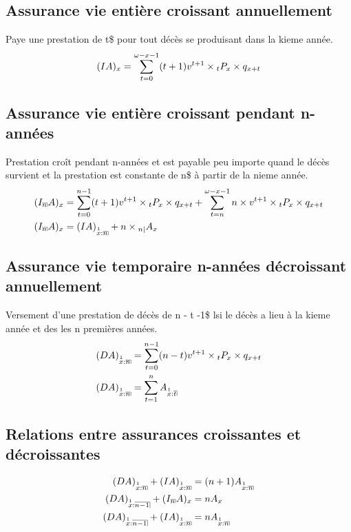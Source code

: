 \documentclass[11pt,french]{report}
\makeatletter
\DeclareRobustCommand{\annuity}[1]{%
\def\arraystretch{0}%
\setlength\arraycolsep{.7pt}%
\setlength\arrayrulewidth{.3pt}%
\begin{array}[b]{@{}c|}\hline
\\[\arraycolsep]%
\scriptstyle #1%
\end{array}%
}
\newcommand{\indiceGauche}[2]{{\vphantom{#2}}_{#1}#2}
\makeatother
\begin{document}
\subsection{Assurance vie entière croissant annuellement}
Paye une prestation de t\$ pour tout décès se produisant dans la kieme année.
\begin{align*}
(IA)_{x} &= \sum_{t=0}^{\omega - x-1}(t + 1)v^{t+1} \times \indiceGauche{t}{P}_{x} \times q_{x+t}\\
\end{align*}

\subsection{Assurance vie  entière croissant pendant n-années}
Prestation croît pendant n-années et est payable peu importe quand le décès survient et la prestation est constante de n\$ à partir de la nieme année.
\begin{align*}
(I_{\annuity{n}}A)_{x} &= \sum_{t=0}^{n-1}(t +1 )v^{t+1} \times \indiceGauche{t}{P}_{x} \times q_{x+t}  + \sum_{t =n}^{\omega - x - 1}n \times v^{t+1} \times \indiceGauche{t}{P}_{x} \times q_{x+t}  \\
(I_{\annuity{n}}A)_{x} &= (IA)_{\overset{1}{x}:\annuity{n}} + n \times \indiceGauche{n|}{A}_x\\
\end{align*}


\subsection{Assurance vie  temporaire n-années décroissant annuellement}
Versement d'une prestation de décès de n - t -1\$ lsi le décès a lieu à la kieme année et des les n premières années.
\begin{align*}
(DA)_{\overset{1}{x}:\annuity{n}} &= \sum_{t = 0}^{n-1}(n - t )v^{t+1} \times \indiceGauche{t}{P}_{x} \times q_{x+t} \\
(DA)_{\overset{1}{x}:\annuity{n}} &= \sum_{t = 1}^{n} A_{\overset{1}{x}:\annuity{t}}
\end{align*}

\subsection{Relations entre assurances croissantes et décroissantes}
\begin{align*}
(DA)_{\overset{1}{x}:\annuity{n}} + (IA)_{\overset{1}{x}:\annuity{n}} &= (n+1) A_{\overset{1}{x}:\annuity{n}} \\
(DA)_{\overset{1}{x}:\annuity{n-1}} + (I_{\annuity{n}}A)_x &= n A_{x} \\
(DA)_{\overset{1}{x}:\annuity{n-1}} + (IA)_{\overset{1}{x}:\annuity{n}} &= n A_{\overset{1}{x}:\annuity{n}} \\
\end{align*}
\end{document}

